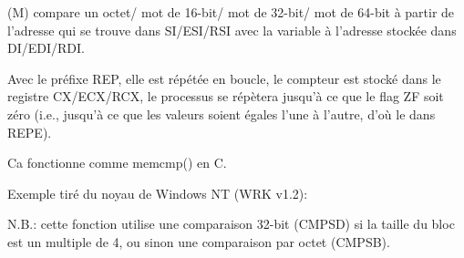 \item[CMPSB/CMPSW/CMPSD/CMPSQ] (M) compare un octet/
mot de 16-bit/
mot de 32-bit/
mot de 64-bit
à partir de l'adresse qui se trouve dans SI/ESI/RSI avec la variable à l'adresse
stockée dans DI/EDI/RDI.

\label{REPE_CMPSx}
Avec le préfixe REP, elle est répétée en boucle, le compteur est stocké dans le registre
CX/ECX/RCX, le processus se répètera jusqu'à ce que le flag ZF soit zéro (i.e., jusqu'à
ce que les valeurs soient égales l'une à l'autre, d'où le  dans REPE).

Ca fonctionne comme memcmp() en C.

Exemple tiré du noyau de Windows NT (\ac{WRK} v1.2):



N.B.: cette fonction utilise une comparaison 32-bit (CMPSD) si la taille du bloc
est un multiple de 4, ou sinon une comparaison par octet (CMPSB).

